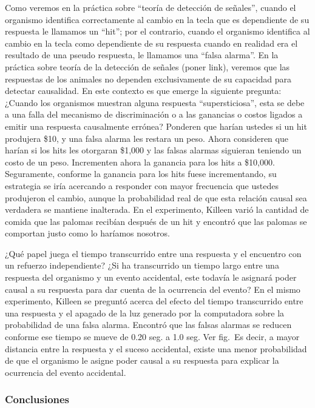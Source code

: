\documentclass[
  a4paper,
  DIV=11,
  numbers=noendperiod]{scrreprt}
\begin{document}
Como veremos en la práctica sobre ``teoría de detección de señales'',
cuando el organismo identifica correctamente al cambio en la tecla que
es dependiente de su respuesta le llamamos un ``hit''; por el contrario,
cuando el organismo identifica al cambio en la tecla como dependiente de
su respuesta cuando en realidad era el resultado de una pseudo
respuesta, le llamamos una ``falsa alarma''. En la práctica sobre teoría
de la detección de señales (poner link), veremos que las respuestas de
los animales no dependen exclusivamente de su capacidad para detectar
causalidad. En este contexto es que emerge la siguiente pregunta:
¿Cuando los organismos muestran alguna respuesta ``supersticiosa'', esta
se debe a una falla del mecanismo de discriminación o a las ganancias o
costos ligados a emitir una respuesta causalmente errónea? Ponderen que
harían ustedes si un hit produjera \$10, y una falsa alarma les restara
un peso. Ahora consideren que harían si los hits les otorgaran \$1,000 y
las falsas alarmas siguieran teniendo un costo de un peso. Incrementen
ahora la ganancia para los hits a \$10,000. Seguramente, conforme la
ganancia para los hits fuese incrementando, su estrategia se iría
acercando a responder con mayor frecuencia que ustedes produjeron el
cambio, aunque la probabilidad real de que esta relación causal sea
verdadera se mantiene inalterada. En el experimento, Killeen varió la
cantidad de comida que las palomas recibían después de un hit y encontró
que las palomas se comportan justo como lo haríamos nosotros.

¿Qué papel juega el tiempo transcurrido entre una respuesta y el
encuentro con un refuerzo independiente? ¿Si ha transcurrido un tiempo
largo entre una respuesta del organismo y un evento accidental, este
todavía le asignará poder causal a su respuesta para dar cuenta de la
ocurrencia del evento? En el mismo experimento, Killeen se preguntó
acerca del efecto del tiempo transcurrido entre una respuesta y el
apagado de la luz generado por la computadora sobre la probabilidad de
una falsa alarma. Encontró que las falsas alarmas se reducen conforme
ese tiempo se mueve de 0.20 seg. a 1.0 seg. Ver fig.~Es decir, a mayor
distancia entre la respuesta y el suceso accidental, existe una menor
probabilidad de que el organismo le asigne poder causal a su respuesta
para explicar la ocurrencia del evento accidental.

\subsubsection{Conclusiones}\label{conclusiones}
\end{document}
